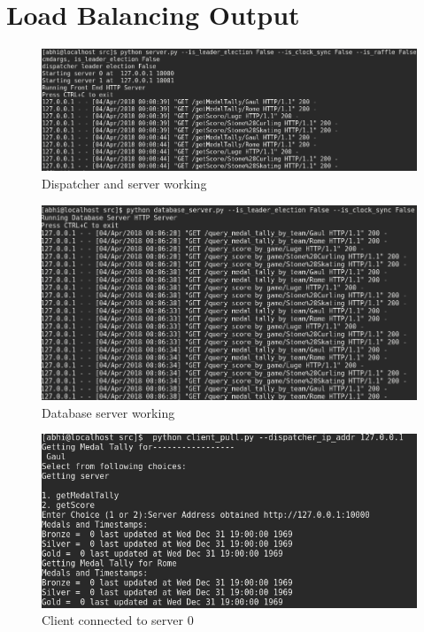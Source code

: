 \documentclass{article}
\begin{document}
\section{Load Balancing Output}

\begin{figure}[H]
        \centering
        \includegraphics[width=\textwidth]{outputs/dispatcher.png}
        \caption{Dispatcher and server working}
\end{figure}

\begin{figure}[H]
        \centering
        \includegraphics[width=\textwidth]{outputs/db_output.png}
        \caption{Database server working}
\end{figure}

\begin{figure}[H]
        \centering
        \includegraphics[width=\textwidth]{outputs/client_pull_server0.png}
        \caption{Client connected to server 0}
\end{figure}
\end{document}
